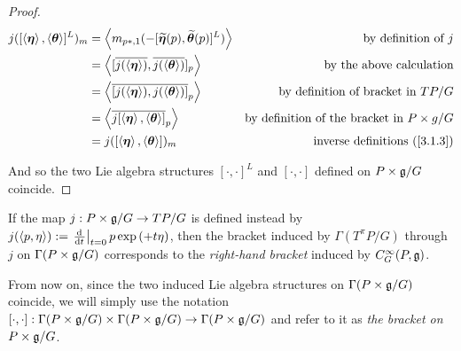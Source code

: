 \begin{proof}
\begin{align*}
    j([\left\langle \bm{\eta} \right\rangle, \left\langle \bm{\theta} \right\rangle]^L)_m 
    &= \left\langle m_{p*, 1} (-[\widetilde{\bm{\eta}}(p), \widetilde{\bm{\theta}}(p)]^L) \right\rangle & \textrm{by definition of $j$} \\ 
    &= \left\langle [\overline{j(\left\langle \bm{\eta} \right\rangle)}, \overline{j(\left\langle \bm{\theta} \right\rangle)}]_p \right\rangle & \textrm{by the above calculation}\\
    &= \left\langle \overline{[j(\left\langle \bm{\eta} \right\rangle), j(\left\langle \bm{\theta} \right\rangle)]}_p \right\rangle & \textrm{by definition of bracket in $TP/G$}\\
    &= \left\langle \overline{j[\left\langle \bm{\eta} \right\rangle, \left\langle \bm{\theta} \right\rangle]}_p \right\rangle & \textrm{by definition of the bracket in $P \times g/G$} \\
    &= j([\left\langle \bm{\eta} \right\rangle, \left\langle \bm{\theta} \right\rangle])_m & \textrm{inverse definitions (\ref{3.1.3})}
\end{align*}

And so the two Lie algebra structures $[\cdot, \cdot]^L$ and $[\cdot, \cdot]$ defined on $P \times \mathfrak{g}/G$ coincide.
\end{proof}
\begin{remark}
If the map $j: P \times \mathfrak{g}/G \to TP/G$ is defined instead by $j(\cl{p, \eta}) := \der{t}[t = 0] p \exp{(+t \eta)}$, then the bracket induced by $\Gamma(T^\pi P/G)$ through $j$ on $\Gamma(P \times \mathfrak{g}/G)$ corresponds to the \emph{right-hand bracket} induced by $C^\infty_G(P, \mathfrak{g})$.
\end{remark}

From now on, since the two induced Lie algebra structures on $\Gamma(P \times \mathfrak{g}/G)$ coincide, we will simply use the notation $[\cdot, \cdot]: \Gamma(P \times \mathfrak{g}/G) \times \Gamma(P \times \mathfrak{g}/G) \to \Gamma(P \times \mathfrak{g}/G)$ and refer to it as \emph{the bracket on $P \times \mathfrak{g}/G$}.

